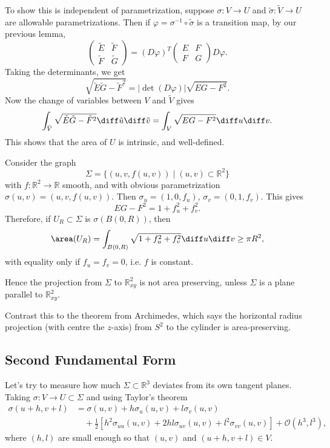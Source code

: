 \documentclass[12pt]{article}
\begin{document}
To show this is independent of parametrization, suppose $\sigma : V \to U$ and $\tilde \sigma : \tilde V \to U$ are allowable parametrizations. Then if $\varphi = \sigma^{-1} \circ \tilde \sigma$ is a transition map, by our previous lemma,
\[
\begin{pmatrix}
	\tilde E & \tilde F \\
	\tilde F & \tilde G
\end{pmatrix}
 = (D \varphi)^{T}
 \begin{pmatrix}
	 E & F \\
	 F & G
 \end{pmatrix}
 D \varphi
.\]
Taking the determinants, we get
\[
	\sqrt{\tilde E \tilde G - \tilde F^2} = |\det (D \varphi)| \sqrt{EG - F^2}
.\]
Now the change of variables between $V$ and $\tilde V$ gives
\[
	\int_{\tilde V} \sqrt{\tilde E \tilde G - \tilde F^2} \diff \tilde u \diff \tilde v = \int_{V} \sqrt{EG - F^2} \diff u \diff v
.\]
This shows that the area of $U$ is intrinsic, and well-defined.

\begin{exbox}
	Consider the graph
	\[
		\Sigma = \{(u, v, f(u, v)) \mid (u, v) \subset \mathbb{R}^2\}
	\]
	with $f : \mathbb{R}^2 \to \mathbb{R}$ smooth, and with obvious parametrization $\sigma(u, v) = (u, v, f(u, v))$. Then $\sigma_u = (1, 0, f_u)$, $\sigma_v = (0, 1, f_v)$. This gives
	\[
	EG - F^2 = 1 + f_u^2 + f_v^2
	.\]
	Therefore, if $U_R \subset \Sigma$ is $\sigma(B(0,R))$, then
	\[
		\area(U_R) = \int_{B(0,R)} \sqrt{1 + f_u^2 + f_v^2} \diff u \diff v \geq \pi R^2
	,\]
	with equality only if $f_u = f_v = 0$, i.e. $f$ is constant.

	Hence the projection from $\Sigma$ to $\mathbb{R}^2_{xy}$ is not area preserving, unless $\Sigma$ is a plane parallel to $\mathbb{R}^2_{xy}$.
\end{exbox}

Contrast this to the theorem from Archimedes, which says the horizontal radius projection (with centre the $z$-axis) from $S^2$ to the cylinder is area-preserving.

\subsection{Second Fundamental Form}
\label{sub:second_fundamental_form}

Let's try to measure how much $\Sigma \subset \mathbb{R}^3$ deviates from its own tangent planes. Taking $\sigma : V \to U \subset \Sigma$ and using Taylor's theorem
\begin{align*}
	\sigma(u+h, v+l) &= \sigma(u, v) + h \sigma_u(u, v) + l \sigma_v(u, v)  \\
			 &\quad + \frac{1}{2} [ h^2 \sigma_{uu}(u,v) + 2hl \sigma_{uv}(u,v) + l^2\sigma_{vv}(u,v)] + \mathcal{O}(h^3, l^3),
\end{align*}
where $(h, l)$ are small enough so that $(u, v)$ and $(u+h, v+l) \in V$.
\end{document}
